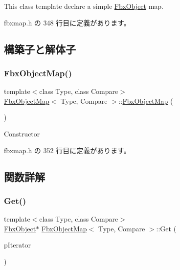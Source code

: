 This class template declare a simple \hyperlink{class_fbx_object}{Fbx\+Object} map. 

 fbxmap.\+h の 348 行目に定義があります。



\subsection{構築子と解体子}
\mbox{\label{class_fbx_object_map_a6567cb563c8c14bf79104468c8622d44}} 
\subsubsection{\texorpdfstring{Fbx\+Object\+Map()}{FbxObjectMap()}}
{\footnotesize\ttfamily template$<$class Type, class Compare$>$ \\
\hyperlink{class_fbx_object_map}{Fbx\+Object\+Map}$<$ Type, Compare $>$\+::\hyperlink{class_fbx_object_map}{Fbx\+Object\+Map} (\begin{DoxyParamCaption}{ }\end{DoxyParamCaption})\hspace{0.3cm}{\ttfamily [inline]}}



Constructor 



 fbxmap.\+h の 352 行目に定義があります。



\subsection{関数詳解}
\mbox{\label{class_fbx_object_map_a0f91929931a5379c7983812644ff706a}} 
\subsubsection{\texorpdfstring{Get()}{Get()}}
{\footnotesize\ttfamily template$<$class Type, class Compare$>$ \\
\hyperlink{class_fbx_object}{Fbx\+Object}$\ast$ \hyperlink{class_fbx_object_map}{Fbx\+Object\+Map}$<$ Type, Compare $>$\+::Get (\begin{DoxyParamCaption}\item[{typename \hyperlink{class_fbx_simple_map}{Fbx\+Simple\+Map}$<$ Type, \hyperlink{class_fbx_object}{Fbx\+Object} $\ast$, Compare $>$\+::\hyperlink{class_fbx_simple_map_aaa589eb5e1ccdd11dffd018f3212e13e}{Iterator}}]{p\+Iterator }\end{DoxyParamCaption})\hspace{0.3cm}{\ttfamily [inline]}}

